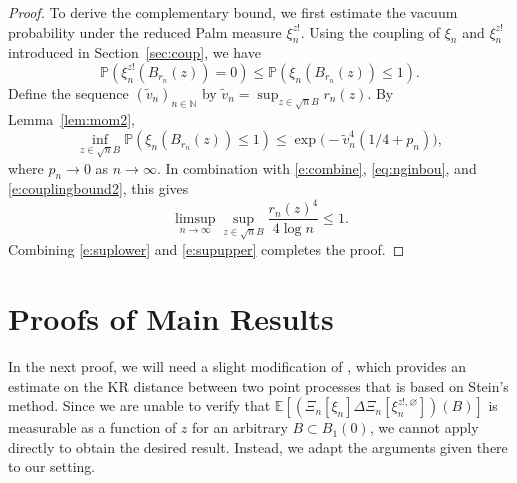 \documentclass{amsart}
\theoremstyle{plain}
\theoremstyle{definition}
\theoremstyle{remark}
\def\E{\mathbb E}
\def\P{\mathbb P}
\begin{document}
\begin{proof}
To derive the complementary bound, we first estimate the vacuum probability under the reduced Palm measure $\xi_n^{z!}$. 
Using the coupling of $\xi_n$ and $\xi_n^{z!}$ introduced in Section~\ref{sec:coup}, we have
\begin{equation} \label{e:couplingbound2}
	\mathbb P(\xi_n^{z!}(B_{r_n}(z))=0) \le \mathbb P(\xi_n(B_{r_n}(z)) \le 1).
\end{equation}
Define the sequence 
$(\tilde v_n)_{n \in \mathbb N}$
by  $\tilde v_n = \sup_{z \in \sqrt n B} r_n(z)$. By Lemma~\ref{lem:mom2}, 
	$$
	\inf_{z \in \sqrt n  B} \P(\xi_n(B_{r_n}(z))\le 1) \le \exp\Big(-\tilde v_n^4  (1/4+p_n)
	\Big),
	$$
	where $p_n \to 0$ as $n \to \infty$. 
In combination with \eqref{e:combine},  \eqref{eq:nginbou}, and \eqref{e:couplingbound2}, this gives 
\begin{equation}\label{e:supupper}
\limsup_{n \to \infty} \sup_{z \in \sqrt n B} \frac{r_n(z)^4}{4 \log n}\le 1.
\end{equation}
Combining \eqref{e:suplower} and \eqref{e:supupper} completes the proof.
\end{proof}

\section{Proofs of Main Results}\label{sec:pr1}

In the next proof, we will need a slight modification of \cite[Theorem 3.1]{BSY21}, which provides an estimate on the KR distance between two point processes that is based on Stein's method. 
Since we are unable to verify that $\E[(\Xi_n[\xi_n]\Delta \Xi_n[\xi_n^{z!, \varnothing}])(B)]$ is measurable as a function of $z$ for an arbitrary $B \subset B_1(0)$, we cannot apply \cite[Theorem 3.1]{BSY21} directly to obtain the desired result.  Instead, we adapt the arguments given there to our setting. 
\end{document}
